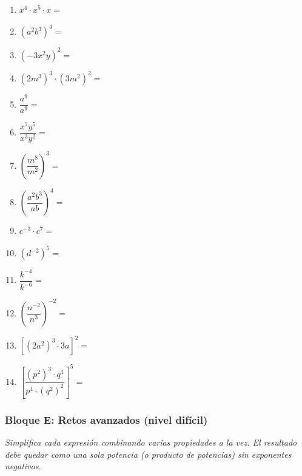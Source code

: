 \documentclass[12pt, letterpaper]{article}
\begin{document}
\begin{enumerate}[leftmargin=*, start=135]
  \item \facil{} $x^4 \cdot x^5 \cdot x =$

  \item \facil{} $(a^2 b^3)^4 =$

  \item \facil{} $(-3x^2y)^2 =$

  \item \medio{} $(2m^3)^3 \cdot (3m^2)^2 =$

  \item \medio{} $\dfrac{a^9}{a^9} =$

  \item \medio{} $\dfrac{x^7y^5}{x^3y^2} =$

  \item \medio{} $\left(\dfrac{m^8}{m^2}\right)^3 =$

  \item \medio{} $\left(\dfrac{a^2b^3}{ab}\right)^4 =$

  \item \medio{} $c^{-3} \cdot c^7 =$

  \item \medio{} $\left(d^{-2}\right)^5 =$

  \item \dificil{} $\dfrac{k^{-4}}{k^{-6}} =$

  \item \dificil{} $\left(\dfrac{n^{-2}}{n^3}\right)^{-2} =$

  \item \dificil{} $\left[(2a^2)^3 \cdot 3a\right]^2 =$

  \item \muyDificil{} $\left[\dfrac{(p^2)^3 \cdot q^4}{p^4 \cdot (q^2)^2}\right]^5 =$
\end{enumerate}

\subsubsection*{Bloque E: Retos avanzados (nivel difícil)}
\textit{Simplifica cada expresión combinando \emph{varias} propiedades a la vez. El resultado debe quedar como una sola potencia (o producto de potencias) sin exponentes negativos.}
\end{document}
